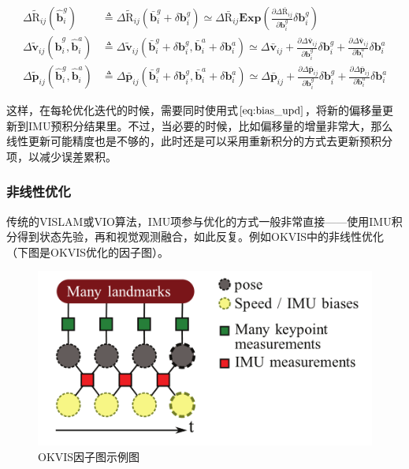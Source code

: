 \begin{equation}
\begin{aligned}
    \Delta\tilde{\mathrm R}_{ij}(\hat{\mathbf b}_i^g)
  &\triangleq \Delta\tilde{\mathrm R}_{ij}(\bar{\mathbf b}^g_i + \delta\mathbf{b}^g_i)
  \simeq \Delta\bar{\mathrm R}_{ij}
  \bm{Exp}\left(
      \tfrac{\partial\Delta\bar{\mathrm R}_{ij}}{\partial\mathbf{b}^g_i}
      \delta\mathbf{b}^g_i
  \right) \\
  \Delta\tilde{\mathbf v}_{ij}(\hat{\mathbf b}^g_i,\hat{\mathbf b}^a_i)
  &\triangleq \Delta\tilde{\mathbf v}_{ij}(
  \bar{\mathbf b}^g_i + \delta\mathbf{b}^g_i,
  \bar{\mathbf b}^a_i + \delta\mathbf{b}^a_i)
  \simeq \Delta\bar{\mathbf v}_{ij} +
  \tfrac{\partial\Delta\bar{\mathbf v}_{ij}}{\partial\mathbf{b}^g_i}
  \delta\mathbf{b}^g_i +
  \tfrac{\partial\Delta\bar{\mathbf v}_{ij}}{\partial\mathbf{b}^a_i}
  \delta\mathbf{b}^a_i \\
  \Delta\tilde{\mathbf p}_{ij}(\hat{\mathbf b}^g_i,\hat{\mathbf b}^a_i)
  &\triangleq \Delta\bar{\mathbf p}_{ij}(
  \bar{\mathbf b}^g_i + \delta\mathbf{b}^g_i,
  \bar{\mathbf b}^a_i + \delta\mathbf{b}^a_i)
  \simeq \Delta\bar{\mathbf p}_{ij} +
  \tfrac{\partial\Delta\bar{\mathbf p}_{ij}}{\partial\mathbf{b}^g_i}
  \delta\mathbf{b}^g_i +
  \tfrac{\partial\Delta\bar{\mathbf p}_{ij}}{\partial\mathbf{b}^a_i}
  \delta\mathbf{b}^a_i
\end{aligned}\label{eq:bias_upd}
\end{equation}

这样，在每轮优化迭代的时候，需要同时使用式$\eqref{eq:bias_upd}$，将新的偏移量更新到IMU预积分结果里。不过，当必要的时候，比如偏移量的增量非常大，那么线性更新可能精度也是不够的，此时还是可以采用重新积分的方式去更新预积分项，以减少误差累积。

\subsubsection*{非线性优化}

传统的VISLAM或VIO算法，IMU项参与优化的方式一般非常直接——使用IMU积分得到状态先验，再和视觉观测融合，如此反复。例如OKVIS中的非线性优化（下图是OKVIS优化的因子图）。

\begin{figure}[htb]
    \centering
    \includegraphics[width=.5\textwidth]{./figs/okvis.png}
    \caption{OKVIS因子图示例图\citep{leutenegger2015keyframe}}
    \label{fig:okvis}
\end{figure}

